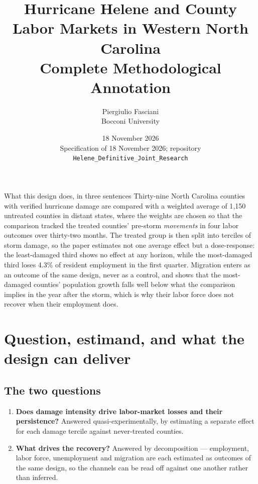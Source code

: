\documentclass[11pt,a4paper]{article}
\title{\textbf{Hurricane Helene and County Labor Markets in Western North Carolina}\\[4pt]
\large Complete Methodological Annotation}
\author{Piergiulio Fasciani \\ \small Bocconi University}
\date{18 November 2026 \\ \small Specification of 18 November 2026; repository \texttt{Helene\_Definitive\_Joint\_Research}}
\begin{document}
\maketitle

\begin{keybox}{What this design does, in three sentences}
Thirty-nine North Carolina counties with verified hurricane damage are compared with a weighted
average of 1{,}150 untreated counties in distant states, where the weights are chosen so that the
comparison tracked the treated counties' pre-storm \emph{movements} in four labor outcomes over
thirty-two months. The treated group is then split into terciles of storm damage, so the paper
estimates not one average effect but a dose-response: the least-damaged third shows no effect at any
horizon, while the most-damaged third loses 4.3\% of resident employment in the first quarter.
Migration enters as an outcome of the same design, never as a control, and shows that the most-damaged
counties' population growth falls well below what the comparison implies in the year after the storm,
which is why their labor force does not recover when their employment does.
\end{keybox}

\tableofcontents

\section{Question, estimand, and what the design can deliver}

\subsection{The two questions}
\begin{enumerate}[nosep,leftmargin=1.4em]
\item \textbf{Does damage intensity drive labor-market losses and their persistence?} Answered
quasi-experimentally, by estimating a separate effect for each damage tercile against never-treated
counties.
\item \textbf{What drives the recovery?} Answered by decomposition --- employment, labor force,
unemployment and migration are each estimated as outcomes of the same design, so the channels can be
read off against one another rather than inferred.
\end{enumerate}
\end{document}
